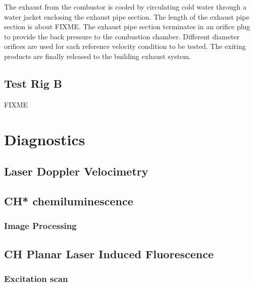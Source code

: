 The exhaust from the combustor is cooled by circulating cold water through a water jacket enclosing the exhaust pipe section.
The length of the exhaust pipe section is about FIXME.
The exhaust pipe section terminates in an orifice plug to provide the back pressure to the combustion chamber.
Different diameter orifices are used for each reference velocity condition to be tested.
The exiting products are finally released to the building exhaust system.

\subsection{Test Rig B}

FIXME

\section{Diagnostics}

\subsection{Laser Doppler Velocimetry}

\subsection{CH* chemiluminescence}

\subsubsection{Image Processing}

\subsection{CH Planar Laser Induced Fluorescence}

\subsubsection{Excitation scan}
